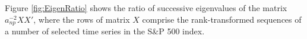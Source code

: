 \documentclass[11pt,reqno]{amsart}
\newcommand{\1}{\mathds{1}}
\newcommand{\0}{\boldsymbol{0}}
\newcommand{\4}{\mathchoice{\mskip1.5mu}{\mskip1.5mu}{}{}}
\newcommand{\5}{\mathchoice{\mskip-1.5mu}{\mskip-1.5mu}{}{}}
\newcommand{\2}{\penalty250\mskip\thickmuskip\mskip-\thinmuskip} %
\begin{document}
Figure \ref{fig:EigenRatio} shows the ratio of successive eigenvalues
of the matrix $a_{np}^{-2}XX'$, where the rows of matrix $X$ comprise
the rank-transformed sequences of a number of selected time series
in the S\&P 500 index.
\begin{figure}[htb!]
  \centering
\end{figure}
\end{document}
